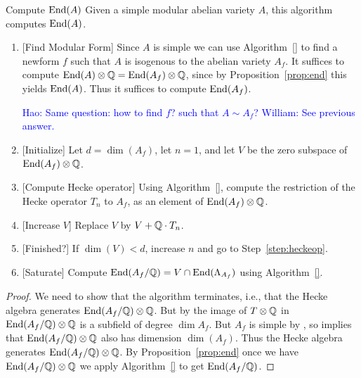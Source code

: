\documentclass{article}
\newcommand{\Hao}[1]{\textcolor{blue}{\textsf{Hao: #1}}}
\newcommand{\wstein}[1]{\textcolor{blue}{\textsf{William: #1}}}
\begin{document}

\begin{algorithm}{Compute $\operatorname{End}(A)$}
Given a simple modular abelian variety $A$, this algorithm
computes $\operatorname{End}(A)$.
\begin{enumerate}
\item{} [Find Modular Form] Since $A$ is simple we can use
  Algorithm~\ref{} to find a newform $f$ such that $A$ is isogenous to
  the abelian variety $A_f$.  It suffices to compute $\operatorname{End}(A)\otimes\mathbb{Q}
  = \operatorname{End}(A_f)\otimes\mathbb{Q}$, since by Proposition~\ref{prop:end} this
  yields $\operatorname{End}(A)$.  Thus it suffices to compute $\operatorname{End}(A_f)$.

\Hao{Same question: how to find $f$? such that $A \sim A_f$?}
\wstein{See previous answer.}

\item{} [Initialize] Let $d=\dim(A_f)$, let $n=1$, and let $V$ be the
  zero subspace of $\operatorname{End}(A_f)\otimes\mathbb{Q}$.
\item{} [Compute Hecke operator]\label{step:heckeop} Using
  Algorithm~\ref{}, compute the restriction of the Hecke operator
  $T_n$ to $A_f$, as an element of $\operatorname{End}(A_f)\otimes\mathbb{Q}$.
\item{} [Increase $V$] Replace $V$ by $V+\mathbb{Q}\cdot T_n$.
\item{} [Finished?]  If $\dim(V) < d$, increase $n$ and go to
  Step~\ref{step:heckeop}.
\item{} [Saturate] Compute $\operatorname{End}(A_f/\mathbb{Q}) = V \cap \operatorname{End}(\Lambda_{A_f})$
  using Algorithm~\ref{}.
\end{enumerate}
\end{algorithm}
\begin{proof}
  We need to show that the algorithm terminates, i.e., that the Hecke
  algebra generates $\operatorname{End}(A_f/\mathbb{Q}) \otimes \mathbb{Q}$. But by
  \cite[Thm.~1]{shimura:factors} the image of $T \otimes \mathbb{Q}$ in
  $\operatorname{End}(A_f/\mathbb{Q}) \otimes \mathbb{Q}$ is a subfield of degree $\dim A_f$. But
  $A_f$ is simple by \cite[Cor.~4.2]{ribet:twistsendoalg}, so
  \cite[Thm.~2.1]{ribet:abvars} implies that $\operatorname{End}(A_f/\mathbb{Q}) \otimes \mathbb{Q}$
  also has dimension $\dim(A_f)$. Thus the Hecke algebra generates
  $\operatorname{End}(A_f/\mathbb{Q}) \otimes \mathbb{Q}$. By Proposition~\ref{prop:end} once we
  have $\operatorname{End}(A_f/\mathbb{Q}) \otimes \mathbb{Q}$ we apply Algorithm~\ref{} to get
  $\operatorname{End}(A_f/\mathbb{Q})$.
\end{proof}
\end{document}
